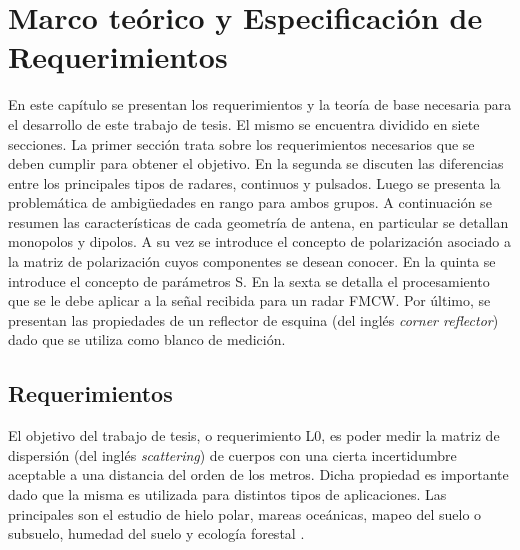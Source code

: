 
\chapter{Marco teórico y Especificación de Requerimientos} \label{ch:theory}


\ifpdf
    \graphicspath{{Chapter2/Figs/Raster/}{Chapter2/Figs/PDF/}{Chapter2/Figs/}}
\else
    \graphicspath{{Chapter2/Figs/Vector/}{Chapter2/Figs/}}
\fi

En este capítulo se presentan los requerimientos y la teoría de base necesaria para el desarrollo de este trabajo de tesis. El mismo se encuentra dividido en siete secciones. La primer sección trata sobre los requerimientos necesarios que se deben cumplir para obtener el objetivo. En la segunda se discuten las diferencias entre los principales tipos de radares, continuos y pulsados. Luego se presenta la problemática de ambigüedades en rango para ambos grupos. A continuación se resumen las características de cada geometría de antena, en particular se detallan monopolos y dipolos. A su vez se introduce el concepto de polarización asociado a la matriz de polarización cuyos componentes se desean conocer. En la quinta se introduce el concepto de parámetros S. En la sexta se detalla el procesamiento que se le debe aplicar a la señal recibida para un radar FMCW. Por último, se presentan las propiedades de un reflector de esquina (del inglés \textit{corner reflector}) dado que se utiliza como blanco de medición.

\section{Requerimientos}

El objetivo del trabajo de tesis, o requerimiento L0, es poder medir la matriz de dispersión (del inglés \textit{scattering}) de cuerpos con una cierta incertidumbre aceptable a una distancia del orden de los metros. Dicha propiedad es importante dado que la misma es utilizada para distintos tipos de aplicaciones. Las principales son el estudio de hielo polar, mareas oceánicas, mapeo del suelo o subsuelo, humedad del suelo y ecología forestal \cite{Curlander}.

